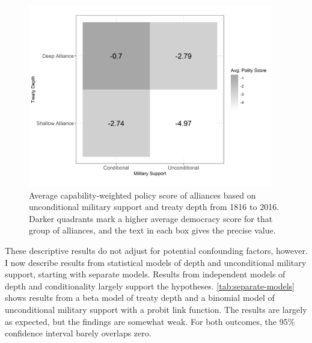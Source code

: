 \documentclass[12pt]{article}
\begin{document}
\begin{figure}[hbtp]
\centering
\includegraphics[width=0.95\textwidth]{../figures/democ-combo.png}
\caption{Average capability-weighted policy score of alliances based on unconditional military support and treaty depth from 1816 to 2016. Darker quadrants mark a higher average democracy score for that group of alliances, and the text in each box gives the precise value. }
\label{fig:democ-combo}
\end{figure}


These descriptive results do not adjust for potential confounding factors, however.
I now describe results from statistical models of depth and unconditional military support, starting with separate models. 
Results from independent models of depth and conditionality largely support the hypotheses. 
\autoref{tab:separate-models} shows results from a beta model of treaty depth and a binomial model of unconditional military support with a probit link function. 
The results are largely as expected, but the findings are somewhat weak.
For both outcomes, the 95\% confidence interval barely overlaps zero.  
\end{document}
